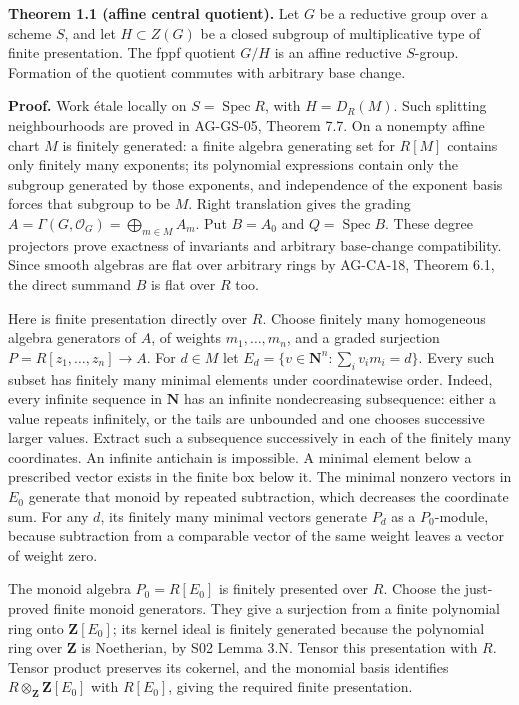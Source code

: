 \documentclass[11pt,a4paper,openany]{report}
\newcounter{none}
\begin{document}
\textbf{Theorem 1.1 (affine central quotient).} Let \(G\) be a reductive group over a scheme \(S\), and let \(H\subset Z(G)\) be a closed subgroup of multiplicative type of finite presentation. The fppf quotient \(G/H\) is an affine reductive \(S\)-group. Formation of the quotient commutes with arbitrary base change.

\textbf{Proof.} Work étale locally on \(S=\operatorname{Spec}R\), with \(H=D_R(M)\). Such splitting neighbourhoods are proved in AG-GS-05, Theorem 7.7. On a nonempty affine chart \(M\) is finitely generated: a finite algebra generating set for \(R[M]\) contains only finitely many exponents; its polynomial expressions contain only the subgroup generated by those exponents, and independence of the exponent basis forces that subgroup to be \(M\). Right translation gives the grading \(A=\Gamma(G,\mathcal O_G)=\bigoplus_{m\in M}A_m\). Put \(B=A_0\) and \(Q=\operatorname{Spec}B\). These degree projectors prove exactness of invariants and arbitrary base-change compatibility. Since smooth algebras are flat over arbitrary rings by AG-CA-18, Theorem 6.1, the direct summand \(B\) is flat over \(R\) too.

Here is finite presentation directly over \(R\). Choose finitely many homogeneous algebra generators of \(A\), of weights \(m_1,\ldots,m_n\), and a graded surjection \(P=R[z_1,\ldots,z_n]\to A\). For \(d\in M\) let \(E_d=\{v\in\mathbf N^n:\sum_i v_i m_i=d\}\). Every such subset has finitely many minimal elements under coordinatewise order. Indeed, every infinite sequence in \(\mathbf N\) has an infinite nondecreasing subsequence: either a value repeats infinitely, or the tails are unbounded and one chooses successive larger values. Extract such a subsequence successively in each of the finitely many coordinates. An infinite antichain is impossible. A minimal element below a prescribed vector exists in the finite box below it. The minimal nonzero vectors in \(E_0\) generate that monoid by repeated subtraction, which decreases the coordinate sum. For any \(d\), its finitely many minimal vectors generate \(P_d\) as a \(P_0\)-module, because subtraction from a comparable vector of the same weight leaves a vector of weight zero.

The monoid algebra \(P_0=R[E_0]\) is finitely presented over \(R\). Choose the just-proved finite monoid generators. They give a surjection from a finite polynomial ring onto \(\mathbf Z[E_0]\); its kernel ideal is finitely generated because the polynomial ring over \(\mathbf Z\) is Noetherian, by S02 Lemma 3.N. Tensor this presentation with \(R\). Tensor product preserves its cokernel, and the monomial basis identifies \(R\otimes_{\mathbf Z}\mathbf Z[E_0]\) with \(R[E_0]\), giving the required finite presentation.
\end{document}
